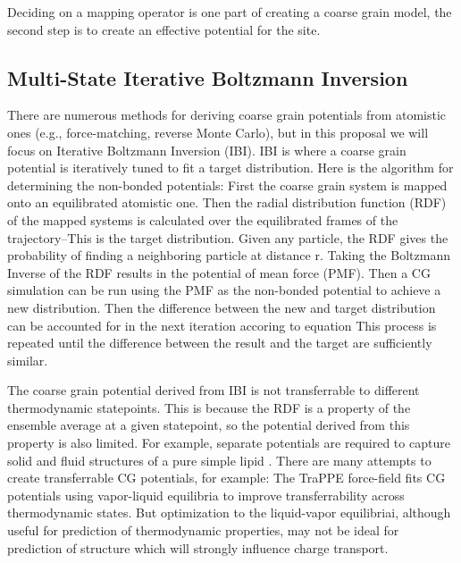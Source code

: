 Deciding on a mapping operator is one part of creating a coarse grain model, the second step is to create an effective potential for the site.

\subsection*{Multi-State Iterative Boltzmann Inversion}

There are numerous methods for deriving coarse grain potentials from atomistic ones (e.g., force-matching, reverse Monte Carlo), but in this proposal we will focus on Iterative Boltzmann Inversion (IBI).
IBI is where a coarse grain potential is iteratively tuned to fit a target distribution\cite{Reith2003}.
Here is the algorithm for determining the non-bonded potentials:
First the coarse grain system is mapped onto an equilibrated atomistic one.
Then the radial distribution function (RDF) of the mapped systems is calculated over the equilibrated frames of the trajectory--This is the target distribution.
Given any particle, the RDF gives the probability of finding a neighboring particle at distance r.
Taking the Boltzmann Inverse of the RDF results in the potential of mean force (PMF). %
Then a CG simulation can be run using the PMF as the non-bonded potential to achieve a new distribution.
Then the difference between the new and target distribution can be accounted for in the next iteration accoring to equation %
This process is repeated until the difference between the result and the target are sufficiently similar.

The coarse grain potential derived from IBI is not transferrable to different thermodynamic statepoints.
This is because the RDF is a property of the ensemble average at a given statepoint, so the potential derived from this property is also limited.
For example, separate potentials are required to capture solid and fluid structures of a pure simple lipid \cite{Hadley2010a}.
There are many attempts to create transferrable CG potentials, for example:
The TraPPE force-field fits CG potentials using vapor-liquid equilibria to improve transferrability across thermodynamic states\cite{Maerzke2011}.
But optimization to the liquid-vapor equilibriai, although useful for prediction of thermodynamic properties, may not be ideal for prediction of structure which will strongly influence charge transport.

